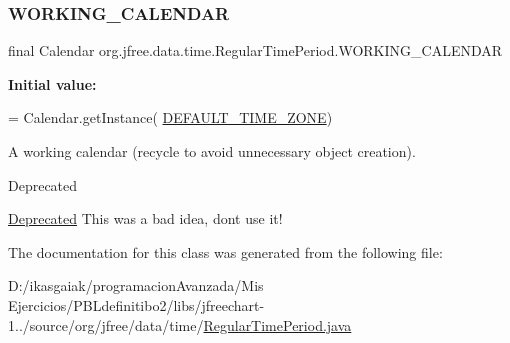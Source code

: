 \subsubsection{\texorpdfstring{W\+O\+R\+K\+I\+N\+G\+\_\+\+C\+A\+L\+E\+N\+D\+AR}{WORKING\_CALENDAR}}
{\footnotesize\ttfamily final Calendar org.\+jfree.\+data.\+time.\+Regular\+Time\+Period.\+W\+O\+R\+K\+I\+N\+G\+\_\+\+C\+A\+L\+E\+N\+D\+AR\hspace{0.3cm}{\ttfamily [static]}}

{\bfseries Initial value\+:}
\begin{DoxyCode}
= Calendar.getInstance(
            \mbox{\hyperlink{classorg_1_1jfree_1_1data_1_1time_1_1_regular_time_period_a559e85c013cd127e53f6e8c491df16cf}{DEFAULT\_TIME\_ZONE}})
\end{DoxyCode}
A working calendar (recycle to avoid unnecessary object creation).

\begin{DoxyRefDesc}{Deprecated}
\item[\mbox{\hyperlink{deprecated__deprecated000272}{Deprecated}}]This was a bad idea, don\textquotesingle{}t use it! \end{DoxyRefDesc}


The documentation for this class was generated from the following file\+:\begin{DoxyCompactItemize}
\item 
D\+:/ikasgaiak/programacion\+Avanzada/\+Mis Ejercicios/\+P\+B\+Ldefinitibo2/libs/jfreechart-\/1../source/org/jfree/data/time/\mbox{\hyperlink{_regular_time_period_8java}{Regular\+Time\+Period.\+java}}\end{DoxyCompactItemize}
